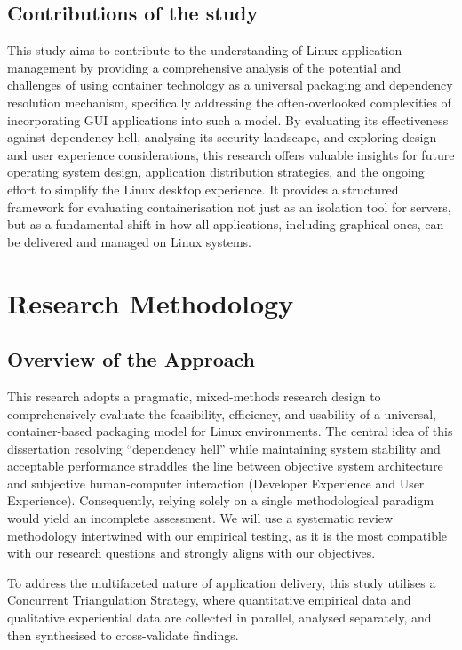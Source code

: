 \documentclass[journal,onecolumn]{IEEEtran}
\begin{document}
\subsection{Contributions of the study}
This study aims to contribute to the understanding of Linux application management by providing a comprehensive analysis of the potential and challenges of using container technology as a universal packaging and dependency resolution mechanism, specifically addressing the often-overlooked complexities of incorporating GUI applications into such a model. By evaluating its effectiveness against dependency hell, analysing its security landscape, and exploring design and user experience considerations, this research offers valuable insights for future operating system design, application distribution strategies, and the ongoing effort to simplify the Linux desktop experience. It provides a structured framework for evaluating containerisation not just as an isolation tool for servers, but as a fundamental shift in how all applications, including graphical ones, can be delivered and managed on Linux systems.

\newpage
\section{Research Methodology}

\subsection{Overview of the Approach}

This research adopts a pragmatic, mixed-methods research design to comprehensively evaluate the feasibility, efficiency, and usability of a universal, container-based packaging model for Linux environments. The central idea of this dissertation resolving ``dependency hell'' while maintaining system stability and acceptable performance straddles the line between objective system architecture and subjective human-computer interaction (Developer Experience and User Experience). Consequently, relying solely on a single methodological paradigm would yield an incomplete assessment. We will use a systematic review methodology intertwined with our empirical testing, as it is the most compatible with our research questions and strongly aligns with our objectives.

To address the multifaceted nature of application delivery, this study utilises a Concurrent Triangulation Strategy, where quantitative empirical data and qualitative experiential data are collected in parallel, analysed separately, and then synthesised to cross-validate findings.
\end{document}
